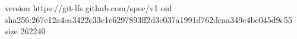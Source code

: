 version https://git-lfs.github.com/spec/v1
oid sha256:267e12a4ea3422e33e1e6297893ff2d3c037a1991d762dcaa349c4be045d9c55
size 262240
